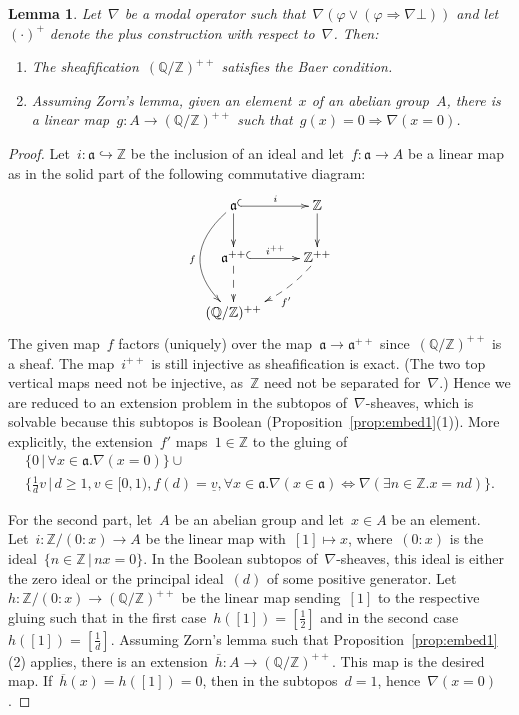 \documentclass[oneside]{amsart}
\theoremstyle{definition}
\theoremstyle{plain}
\newtheorem{lemma}[defn]{Lemma}
\theoremstyle{remark}
\newcommand{\aaa}{\mathfrak{a}}
\newcommand{\ZZ}{\mathbb{Z}}
\newcommand{\QQ}{\mathbb{Q}}
\renewcommand{\_}{\mathpunct{.}\,}
\begin{document}
\begin{lemma}\label{lemma:q-mod-z}
Let~$\nabla$ be a modal operator such
that~$\nabla(\varphi \vee (\varphi \Rightarrow \nabla\bot))$ and
let~$(\cdot)^+$ denote the plus construction with respect to~$\nabla$. Then:
\begin{enumerate}
\item The sheafification~$(\QQ/\ZZ)^{++}$ satisfies the Baer condition.
\item Assuming Zorn's lemma, given an element~$x$ of an abelian group~$A$,
there is a linear map~$g : A \to (\QQ/\ZZ)^{++}$ such that~$g(x) = 0
\Rightarrow \nabla(x=0)$.
\end{enumerate}
\end{lemma}

\begin{proof}Let~$i : \aaa \hookrightarrow \ZZ$ be the inclusion of an ideal
and let~$f : \aaa \to A$ be a linear map as in the solid part of the following
commutative diagram:
\[ \xymatrix{
  \aaa \ar@{^{(}->}[r]^i\ar[d]\ar@/_2pc/[dd]_f & \ZZ \ar[d] \\
  \aaa^{++} \ar@{^{(}->}[r]^{i^{++}}\ar@{-->}[d] & \ZZ^{++}\ar@{-->}@/^/[ld]^{f'} \\
  (\QQ/\ZZ)^{++}
} \]
The given map~$f$ factors (uniquely) over the map~$\aaa \to \aaa^{++}$
since~$(\QQ/\ZZ)^{++}$ is a sheaf. The map~$i^{++}$ is still injective as
sheafification is exact. (The two top vertical maps need not be injective,
as~$\ZZ$ need not be separated for~$\nabla$.) Hence we are reduced to an
extension problem in the subtopos of~$\nabla$-sheaves, which is solvable
because this subtopos is Boolean (Proposition~\ref{prop:embed1}(1)). More
explicitly, the extension~$f'$ maps~$1 \in \ZZ$ to the gluing of
\begin{multline*}
  \{ 0 \,|\, \forall x \in \aaa. \nabla(x = 0) \} \cup {}\\
  \{ \tfrac{1}{d} v \,|\, d \geq 1, v \in [0,1),
    f(d) = \underline{v}, \forall x \in \aaa. \nabla(x \in \aaa)
    \Leftrightarrow \nabla(\exists n \in \ZZ. x = nd) \}.
\end{multline*}

For the second part, let~$A$ be an abelian group and let~$x \in A$ be an
element. Let~$i : \ZZ/(0:x) \to A$ be the linear map with~$[1] \mapsto x$,
where~$(0:x)$ is the ideal~$\{ n \in \ZZ \,|\, nx = 0 \}$. In the Boolean
subtopos of~$\nabla$-sheaves, this ideal is either the zero ideal or the
principal ideal~$(d)$ of some positive generator. Let~$h : \ZZ/(0:x) \to
(\QQ/\ZZ)^{++}$ be the linear map sending~$[1]$ to the respective gluing such
that in the first case~$h([1]) = [\tfrac{1}{2}]$ and in the second case~$h([1])
= [\frac{1}{d}]$. Assuming Zorn's lemma such that
Proposition~\ref{prop:embed1}(2) applies, there is an extension~$\overline{h} :
A \to (\QQ/\ZZ)^{++}$. This map is the desired map. If~$\overline{h}(x) =
h([1]) = 0$, then in the subtopos~$d = 1$, hence~$\nabla(x = 0)$.
\end{proof}
\end{document}
